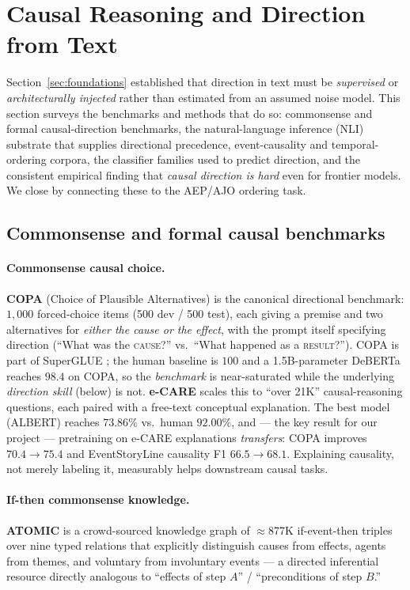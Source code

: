 \section{Causal Reasoning and Direction from Text}
\label{sec:causal-reasoning}

Section~\ref{sec:foundations} established that direction in text must be
\emph{supervised} or \emph{architecturally injected} rather than estimated from
an assumed noise model. This section surveys the benchmarks and methods that do
so: commonsense and formal causal-direction benchmarks, the natural-language
inference (NLI) substrate that supplies directional precedence, event-causality
and temporal-ordering corpora, the classifier families used to predict
direction, and the consistent empirical finding that \emph{causal direction is
hard} even for frontier models. We close by connecting these to the AEP/AJO
ordering task.

\subsection{Commonsense and formal causal benchmarks}
\label{sec:causal-bench}

\paragraph{Commonsense causal choice.}
\textbf{COPA} (Choice of Plausible Alternatives) \citep{caus:roemmele2011copa}
is the canonical directional benchmark: $1{,}000$ forced-choice items
(500 dev / 500 test), each giving a premise and two alternatives for
\emph{either the cause or the effect}, with the prompt itself specifying
direction (``What was the \textsc{cause}?'' vs.\ ``What happened as a
\textsc{result}?''). COPA is part of SuperGLUE
\citep{caus:wang2019superglue}; the human baseline is $100$ and a 1.5B-parameter
DeBERTa reaches $98.4$ on COPA, so the \emph{benchmark} is near-saturated while
the underlying \emph{direction skill} (below) is not. \textbf{e-CARE}
\citep{caus:du2022ecare} scales this to ``over 21K'' causal-reasoning questions,
each paired with a free-text conceptual explanation. The best model (ALBERT)
reaches $73.86\%$ vs.\ human $92.00\%$, and --- the key result for our project ---
pretraining on e-CARE explanations \emph{transfers}: COPA improves
$70.4\to75.4$ and EventStoryLine causality F1 $66.5\to68.1$. Explaining
causality, not merely labeling it, measurably helps downstream causal tasks.

\paragraph{If-then commonsense knowledge.}
\textbf{ATOMIC} \citep{caus:sap2019atomic} is a crowd-sourced knowledge graph of
$\approx$877K if-event-then triples over nine typed relations that explicitly
distinguish causes from effects, agents from themes, and voluntary from
involuntary events --- a directed inferential resource directly analogous to
``effects of step $A$'' / ``preconditions of step $B$.''

